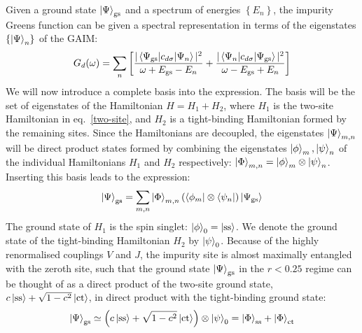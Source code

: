 \documentclass[reprint,superscriptaddress,floatfix]{revtex4-2}
\begin{document}
Given a ground state \(\ket{\Psi}_\text{gs}\) and a spectrum of energies \(\left\{ E_n \right\} \), the impurity Greens function can be given a spectral representation in terms of the eigenstates \(\left\{\ket{\Psi}_n\right\}\) of the GAIM:
\begin{equation}\begin{aligned}
	\label{green_spectral}
G_d(\omega) = \sum_n \left[ \frac{|\braket{\Psi_\text{gs} | c_{d\sigma} | \Psi_n}|^2}{\omega + E_\text{gs} - E_n} + \frac{|\braket{\Psi_n | c_{d\sigma} | \Psi_\text{gs}}|^2}{\omega - E_\text{gs} + E_n}\right] 
\end{aligned}\end{equation}
We will now introduce a complete basis into the expression. The basis will be the set of eigenstates of the Hamiltonian  \(H = H_1 + H_2\), where \(H_1\) is the two-site Hamiltonian in eq.~\ref{two-site}, and \(H_2\) is a tight-binding Hamiltonian formed by the remaining sites. Since the Hamiltonians are decoupled, the eigenstates \(\ket{\Psi}_{m,n}\) will be direct product states formed by combining the eigenstates \(\ket{\phi}_m,\ket{\psi}_n\) of the individual Hamiltonians \(H_1\) and \(H_2\) respectively: \(\ket{\Phi}_{m,n} = \ket{\phi}_m\otimes\ket{\psi}_n\). Inserting this basis leads to the expression:
\begin{equation}\begin{aligned}
	\label{summation}
	\ket{\Psi}_\text{gs} = \sum_{m,n} \ket{\Phi}_{m,n} \left(\bra{\phi_{m}}\otimes\bra{\psi_n}\right)\ket{\Psi_\text{gs}}
\end{aligned}\end{equation}
The ground state of \(H_1\) is the spin singlet: \(\ket{\phi}_0 = \ket{\text{ss}}\). We denote the ground state of the tight-binding Hamiltonian \(H_2\) by \(\ket{\psi}_0\). Because of the highly renormalised couplings \(V\) and \(J\), the impurity site is almost maximally entangled with the zeroth site, such that the ground state \(\ket{\Psi}_\text{gs}\) in the \(r < 0.25\) regime can be thought of as a direct product of the two-site ground state, \(c\ket{\text{ss}} + \sqrt{1-c^2}\ket{\text{ct}}\), in direct product with the tight-binding ground state:
\begin{equation}\begin{aligned}
	\ket{\Psi}_\text{gs} \simeq \left(c\ket{\text{ss}} + \sqrt{1-c^2}\ket{\text{ct}}\right)  \otimes \ket{\psi}_0 = \ket{\Phi}_\text{ss} + \ket{\Phi}_\text{ct}
\end{aligned}\end{equation}
\end{document}

